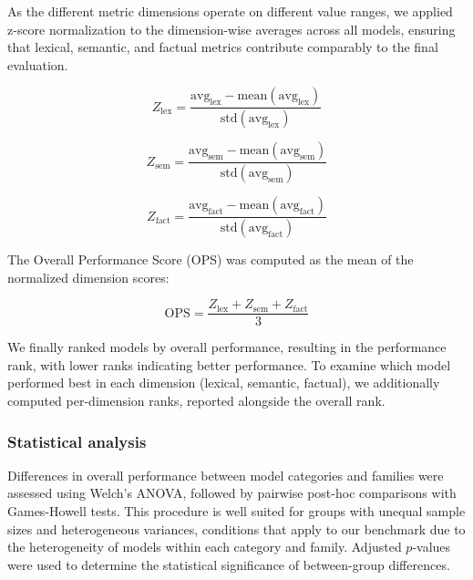 As the different metric dimensions operate on different value ranges, we applied z-score normalization to the dimension-wise averages across all models, ensuring that lexical, semantic, and factual metrics contribute comparably to the final evaluation.

{\scriptsize
\begin{equation}
Z_{\text{lex}} =
\frac{
\mathrm{avg}_{\text{lex}} - \mathrm{mean}(\mathrm{avg}_{\text{lex}})
}{
\mathrm{std}(\mathrm{avg}_{\text{lex}})
}
\end{equation}
}

{\scriptsize
\begin{equation}
Z_{\text{sem}} =
\frac{
\mathrm{avg}_{\text{sem}} - \mathrm{mean}(\mathrm{avg}_{\text{sem}})
}{
\mathrm{std}(\mathrm{avg}_{\text{sem}})
}
\end{equation}
}

{\scriptsize
\begin{equation}
Z_{\text{fact}} =
\frac{
\mathrm{avg}_{\text{fact}} - \mathrm{mean}(\mathrm{avg}_{\text{fact}})
}{
\mathrm{std}(\mathrm{avg}_{\text{fact}})
}
\end{equation}
}

The Overall Performance Score (OPS) was computed as the mean of the normalized dimension scores:

{\scriptsize
\begin{equation}
\mathrm{OPS} =
\frac{
Z_{\text{lex}} + Z_{\text{sem}} + Z_{\text{fact}}
}{3}
\end{equation}
}

We finally ranked models by overall performance, resulting in the performance rank, with lower ranks indicating better performance. To examine which model performed best in each dimension (lexical, semantic, factual), we additionally computed per-dimension ranks, reported alongside the overall rank.

\subsubsection{Statistical analysis}

Differences in overall performance between model categories and families were assessed using Welch’s \ac{ANOVA}, followed by pairwise post-hoc comparisons with Games-Howell tests. This procedure is well suited for groups with unequal sample sizes and heterogeneous variances, conditions that apply to our benchmark due to the heterogeneity of models within each category and family. Adjusted $p$-values were used to determine the statistical significance of between-group differences.
